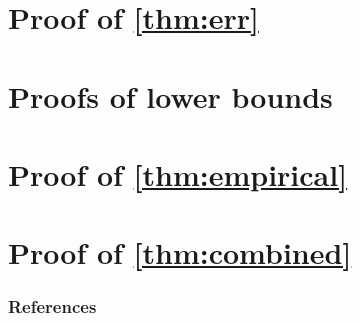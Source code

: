 \documentclass{article}
\begin{document}
\newpage

\appendix

\begin{bibunit}[myunsrt]
  \section{Proof of \cref{thm:err}}\label{app:upper}
  

  \section{Proofs of lower bounds}\label{app:lower}
  

  \section{Proof of \cref{thm:empirical}}\label{app:empirical}
  

  \section{Proof of \cref{thm:combined}}\label{app:combined}
  

  \subsubsection*{References}
  {\def\section*#1{}\small\putbib[all]}
\end{bibunit}
\end{document}
